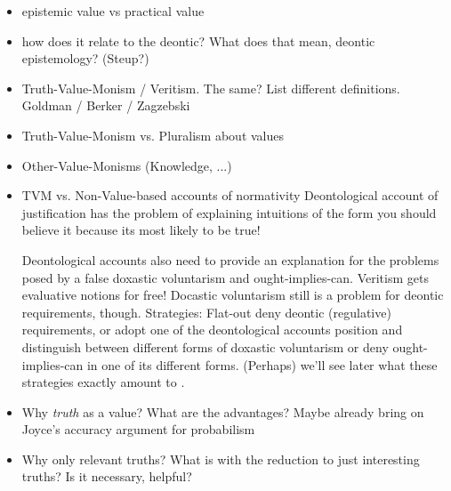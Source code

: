 \documentclass[12pt,numbers=noenddot]{scrartcl}
\begin{document}
\begin{itemize}
    \item epistemic value vs practical value
    \item how does it relate to the deontic? What does that mean, deontic epistemology? (Steup?)
    \item Truth-Value-Monism / Veritism. The same? List different definitions. Goldman / Berker / Zagzebski 
    \item Truth-Value-Monism vs. Pluralism about values 
    \item Other-Value-Monisms (Knowledge, ...) 
    \item TVM vs. Non-Value-based accounts of normativity 
    Deontological account of justification has the problem of explaining intuitions of the form you should believe it because its most likely to be true!

    Deontological accounts also need to provide an explanation for the problems posed by a false doxastic voluntarism and ought-implies-can. Veritism gets evaluative notions for free! Docastic voluntarism still is a problem for deontic requirements, though. Strategies: Flat-out deny deontic (regulative) requirements, or adopt one of the deontological accounts position and distinguish between different forms of doxastic voluntarism or deny ought-implies-can in one of its different forms. (Perhaps) we'll see later what these strategies exactly amount to .
    \item Why \emph{truth} as a value? What are the advantages? Maybe already bring on Joyce's accuracy argument for probabilism 
    \item Why only relevant truths? What is with the reduction to just interesting truths? Is it necessary, helpful? 
\end{itemize}
\end{document}
